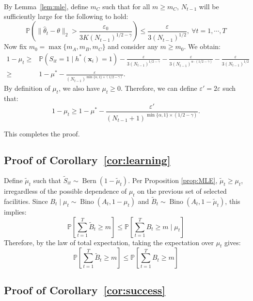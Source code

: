 \documentclass[nonblindrev]{informs3noheader}
\DeclareMathOperator{\Bern}{Bern}
\DeclareMathOperator\Bino{Bino}
\def\P{\mathbb{P}}
\def\bx{\boldsymbol{x}}
\begin{document}
By Lemma~\ref{lem:mle}, define $m_C$ such that for all $m\geq m_C$, $N_{t-1}$ will be sufficiently large for the following to hold:
    \begin{equation}
        \P\left( \|\widehat\theta_t -\theta\|_2 > \frac{\varepsilon_0}{3K(N_{t-1})^{1/2-\gamma}} \right)\leq \frac{\varepsilon }{3(N_{t-1})^{1/2}},\ \forall t=1,\cdots,T \label{eq:mle_bound2}
    \end{equation}
    Now fix $m_0=\max\{m_A,m_B,m_C\}$ and consider any $m\geq m_0$. We obtain:
\begin{align*}
1-\mu_t\geq&\P(S_{it}=1 \mid h^*(\bx_i)=1)-\frac{\varepsilon}{3(N_{t-1})^{1/2-\gamma}}- \frac{\varepsilon}{3(N_{t-1})^{\alpha\cdot(1/2-\gamma)}}
-\frac{\varepsilon }{3(N_{t-1})^{1/2}}\\
\geq&1-\mu^*-\frac{\varepsilon}{(N_{t-1})^{\min\{\alpha,1\}\times (1/2-\gamma)}}.
\end{align*}
By definition of $\mu_t$, we also have $\mu_t \geq 0$. Therefore, we can define $\varepsilon'=2\varepsilon$ such that:
\[1-\mu_t\geq 1-\mu^*-\frac{\varepsilon'}{(N_{t-1}+1)^{\min\{\alpha,1\}\times (1/2-\gamma)}}.\]

This completes the proof.\hfill\Halmos

\subsection{Proof of Corollary~\ref{cor:learning}}

Define $\widetilde\mu_t$ such that $\widetilde{S}_{it} \sim \Bern(1-\widetilde\mu_t)$. Per Proposition \ref{prop:MLE}, $\widetilde\mu_t\geq  \mu_t$, irregardless of the possible dependence of $\mu_t$ on the previous set of selected facilities. Since $B_t \mid \mu_t \sim \Bino\left(A_t, 1-\mu_t\right)$ and $\widetilde{B}_t \sim \Bino\left(A_t, 1-\widetilde\mu_t\right)$, this implies:
    \[\P\left[\sum_{t=1}^T\widetilde{B}_t\geq m \right] \leq \P\left[\sum_{t=1}^TB_t\geq m \mid \mu_t \right]\]
Therefore, by the law of total expectation, taking the expectation over $\mu_t$ gives:
    \[\P\left[\sum_{t=1}^T\widetilde{B}_t\geq m \right] \leq \P\left[\sum_{t=1}^TB_t\geq m \right]\]

\subsection{Proof of Corollary~\ref{cor:success}}
\end{document}
